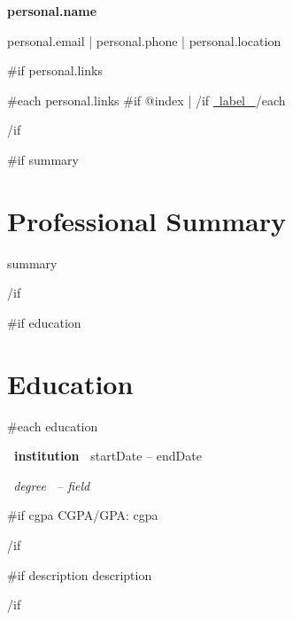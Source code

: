 \documentclass[10pt,a4paper]{article}
\begin{document}
\color{dark}

\begin{center}
    {\LARGE\bfseries\color{primary}
    {{personal.name}}
    \par}

    \vspace{5pt}

    {\small
    {{personal.email}}
    \quad | \quad
    {{personal.phone}}
    \quad | \quad
    {{personal.location}}
    \par}

    {{#if personal.links}}
    \vspace{3pt}
    {\small
    {{#each personal.links}}
    {{#if @index}}
    \quad | \quad
    {{/if}}
    \href{ {{~url~}} }{ {{~label~}} }
    {{/each}}
    \par}
    {{/if}}
\end{center}

\vspace{2pt}

{{#if summary}}
\section{Professional Summary}

{{summary}}

{{/if}}

{{#if education}}
\section{Education}

{{#each education}}

\textbf{ {{~institution~}} }
\hfill
{\small {{startDate}} -- {{endDate}} }

\par

\textit{ {{~degree~}} -- {{field}} }

\par

{{#if cgpa}}
{\small CGPA/GPA: {{cgpa}} }
\par
{{/if}}

{{#if description}}
{\small {{description}} }
\par
{{/if}}
\end{document}

